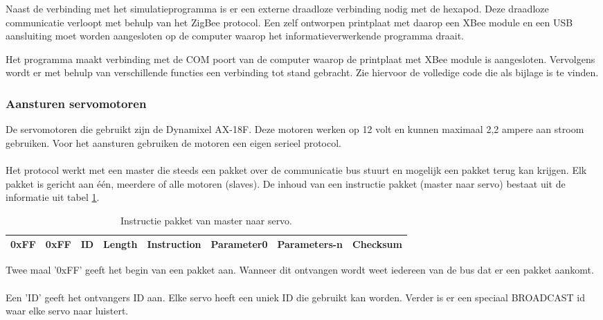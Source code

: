 \documentclass[10pt,a4paper]{article}
\begin{document}


Naast de verbinding met het simulatieprogramma is er een externe draadloze verbinding nodig met de hexapod. Deze draadloze communicatie verloopt met behulp van het ZigBee protocol. Een zelf ontworpen printplaat met daarop een XBee module en een USB aansluiting moet worden aangesloten op de computer waarop het informatieverwerkende programma draait.

Het programma maakt verbinding met de COM poort van de computer waarop de printplaat met XBee module is aangesloten. Vervolgens wordt er met behulp van verschillende functies een verbinding tot stand gebracht. Zie hiervoor de volledige code die als bijlage is te vinden. 


\subsubsection{Aansturen servomotoren}
De servomotoren die gebruikt zijn de Dynamixel AX-18F. Deze motoren werken op 12 volt en kunnen maximaal 2,2 ampere aan stroom gebruiken.
Voor het aansturen gebruiken de motoren een eigen serieel protocol.\\\\
Het protocol werkt met een master die steeds een pakket over de communicatie bus stuurt en mogelijk een pakket terug kan krijgen. Elk pakket is gericht aan \'e\'en, meerdere of alle motoren (slaves).
De inhoud van een instructie pakket (master naar servo) bestaat uit de informatie uit tabel \ref{instructionpackage}.

\begin{table}[]
\centering
\caption{Instructie pakket van master naar servo.}
\label{instructionpackage}
\begin{tabular}{|l|l|l|l|l|l|l|l|}
\hline
0xFF & 0xFF & ID & Length & Instruction & Parameter0 & Parameters-n & Checksum \\ \hline
\end{tabular}
\end{table}

Twee maal '0xFF' geeft het begin van een pakket aan. Wanneer dit ontvangen wordt weet iedereen van de bus dat er een pakket aankomt.\\\\
Een 'ID' geeft het ontvangers ID aan. Elke servo heeft een uniek ID die gebruikt kan worden. Verder is er een speciaal BROADCAST id waar elke servo naar luistert.
\end{document}
